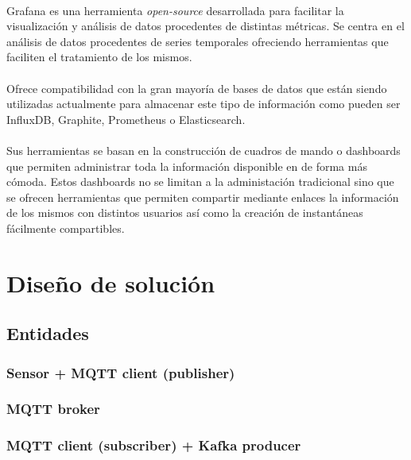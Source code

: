 \documentclass[12pt, a4paper]{article}
\begin{document}
        \paragraph{}
        Grafana es una herramienta \textit{open-source} desarrollada para facilitar la visualización y análisis de datos procedentes de distintas métricas. Se centra en el análisis de datos procedentes de series temporales ofreciendo herramientas que faciliten el tratamiento de los mismos.

        \paragraph{}
        Ofrece compatibilidad con la gran mayoría de bases de datos que están siendo utilizadas actualmente para almacenar este tipo de información como pueden ser InfluxDB, Graphite, Prometheus o Elasticsearch.

        \paragraph{}
        Sus herramientas se basan en la construcción de cuadros de mando o dashboards que permiten administrar toda la información disponible en de forma más cómoda. Estos dashboards no se limitan a la administación tradicional sino que se ofrecen herramientas que permiten compartir mediante enlaces la información de los mismos con distintos usuarios así como la creación de instantáneas fácilmente compartibles.

        \section{Diseño de solución}

        \subsection{Entidades}

        \subsubsection{Sensor + MQTT client (publisher)}
        \subsubsection{MQTT broker}
        \subsubsection{MQTT client (subscriber) + Kafka producer}
\end{document}
